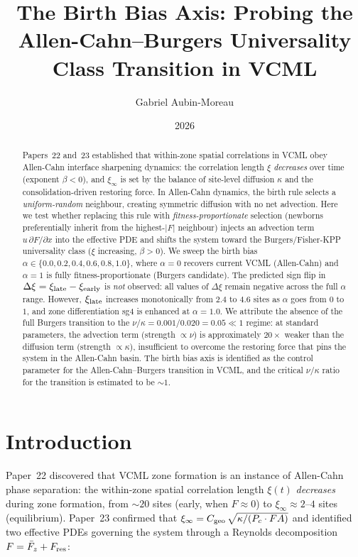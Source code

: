 \documentclass[11pt]{article}
\title{The Birth Bias Axis: Probing the Allen-Cahn--Burgers Universality
       Class Transition in VCML}
\author{Gabriel Aubin-Moreau}
\date{2026}
\begin{document}
\maketitle

\begin{abstract}
Papers~22 and~23 established that within-zone spatial correlations in VCML
obey Allen-Cahn interface sharpening dynamics: the correlation length $\xi$
\emph{decreases} over time (exponent $\beta < 0$), and $\xi_\infty$ is set
by the balance of site-level diffusion $\kappa$ and the consolidation-driven
restoring force.
In Allen-Cahn dynamics, the birth rule selects a \emph{uniform-random} neighbour,
creating symmetric diffusion with no net advection.
Here we test whether replacing this rule with \emph{fitness-proportionate}
selection (newborns preferentially inherit from the highest-$|F|$ neighbour)
injects an advection term $u\,\partial F/\partial x$ into the effective PDE
and shifts the system toward the Burgers/Fisher-KPP universality class
($\xi$ increasing, $\beta > 0$).
We sweep the birth bias $\alpha \in \{0.0, 0.2, 0.4, 0.6, 0.8, 1.0\}$,
where $\alpha=0$ recovers current VCML (Allen-Cahn) and $\alpha=1$ is
fully fitness-proportionate (Burgers candidate).
The predicted sign flip in $\Delta\xi = \xi_{\rm late} - \xi_{\rm early}$
is \emph{not} observed: all values of $\Delta\xi$ remain negative across
the full $\alpha$ range.
However, $\xi_{\rm late}$ increases monotonically from $2.4$ to $4.6$ sites
as $\alpha$ goes from $0$ to $1$, and zone differentiation sg4 is enhanced
at $\alpha=1.0$.
We attribute the absence of the full Burgers transition to the
$\nu/\kappa = 0.001/0.020 = 0.05 \ll 1$ regime: at standard parameters,
the advection term (strength $\propto \nu$) is approximately $20\times$
weaker than the diffusion term (strength $\propto \kappa$), insufficient
to overcome the restoring force that pins the system in the Allen-Cahn
basin.
The birth bias axis is identified as the control parameter for the
Allen-Cahn--Burgers transition in VCML, and the critical $\nu/\kappa$ ratio
for the transition is estimated to be $\sim 1$.
\end{abstract}

\section{Introduction}

Paper~22 discovered that VCML zone formation is an instance of Allen-Cahn
phase separation: the within-zone spatial correlation length $\xi(t)$
\emph{decreases} during zone formation, from ${\sim}20$ sites (early,
when $F \approx 0$) to $\xi_\infty \approx 2$--$4$ sites (equilibrium).
Paper~23 confirmed that $\xi_\infty = C_{\rm geo}\,\sqrt{\kappa/(P_c \cdot FA)}$
and identified two effective PDEs governing the system through a
Reynolds decomposition $F = \bar{F}_z + F_{\rm res}$:
\end{document}
